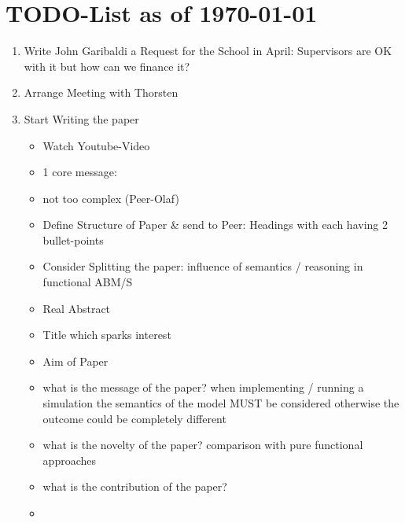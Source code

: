 \section{TODO-List as of \today}

\begin{enumerate}
\item Write John Garibaldi a Request for the School in April: Supervisors are OK with it but how can we finance it?

\item Arrange Meeting with Thorsten

\item Start Writing the paper
	\begin{itemize}
		\item Watch Youtube-Video
		\item 1 core message:
		\item not too complex (Peer-Olaf)
		\item Define Structure of Paper \& send to Peer: Headings with each having 2 bullet-points
		\item Consider Splitting the paper: influence of semantics / reasoning in functional ABM/S
		\item Real Abstract
		\item Title which sparks interest
		\item Aim of Paper
		\item what is the message of the paper? when implementing / running a simulation the semantics of the model MUST be considered otherwise the outcome could be completely different
		\item what is the novelty of the paper? comparison with pure functional approaches
		\item what is the contribution of the paper? 
		\item 
	\end{itemize}


\end{enumerate}
